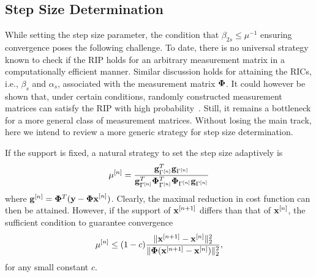 \documentclass{article}
\begin{document}
\subsection{Step Size Determination} 
While setting the step size parameter, the condition that $\beta_{2s}\leq\mu^{-1}$ ensuring convergence poses the following challenge. To date, there is no universal strategy known to check if the RIP holds for an arbitrary measurement matrix in a computationally efficient manner. Similar discussion holds for attaining the RICs, i.e., ${\beta_s}$ and $\alpha_s$, associated with the measurement matrix ${\bf \Phi}$. It could however be shown that, under certain conditions, randomly constructed measurement matrices can satisfy
the RIP with high probability~\cite{candes2008rip, chartrand2008rip}. Still, it remains a bottleneck for a more general class of
measurement matrices. Without losing the main track, here we intend to review a more generic strategy for step size determination.

If the support is fixed, a natural strategy to set the step size adaptively is~\cite{blumensath2010niht}
\begin{equation}\label{step_size}
   \mu^{[n]} = \frac{{\bf g}^T_{\Gamma^{[n]}}{\bf g}_{\Gamma^{[n]}}}{{\bf g}^T_{\Gamma^{[n]}}{\bf \Phi}^T_{\Gamma^{[n]}}{\bf \Phi}_{\Gamma^{[n]}}{\bf g}_{\Gamma^{[n]}}}
\end{equation}
where ${\bf g}^{[n]} = {\bf \Phi}^T({\bf y}-{\bf \Phi x}^{[n]})$. Clearly, the maximal reduction in cost function can then be attained. However, if the support of ${\bf x}^{[n+1]}$ differs than that of ${\bf x}^{[n]}$, the sufficient condition to guarantee convergence 
\begin{equation}
    \mu^{[n]} \leq(1-c) \frac{\|{\bf x}^{[n+1]}-{\bf x}^{[n]} \|_2^2}{\|{\bf \Phi}({\bf x}^{[n+1]}-{\bf x}^{[n]}) \|_2^2},
\end{equation}
for any small constant $c$.
\end{document}
